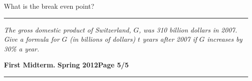\documentclass[12pt]{article}
\begin{document}
\begin{flushright}
\end{flushright}
\noindent
What is the break even point?
\vspace{3cm}

\begin{flushright}
\end{flushright}
\hrule
{\problem[10 pts] \em The gross domestic product of Switzerland, $G$,
  was 310 billion dollars in 2007.  Give a formula for $G$ (in
  billions of dollars) $t$ years after 2007 if $G$ increases by 30\% a
  year.}
\vspace{4cm}
\begin{flushright}
\end{flushright}
\newpage

\hfill{\large\bf First Midterm.}\hfill{\large\bf
  Spring 2012}\hfill{\large\bf Page 5/5}\hrule
\end{document}
